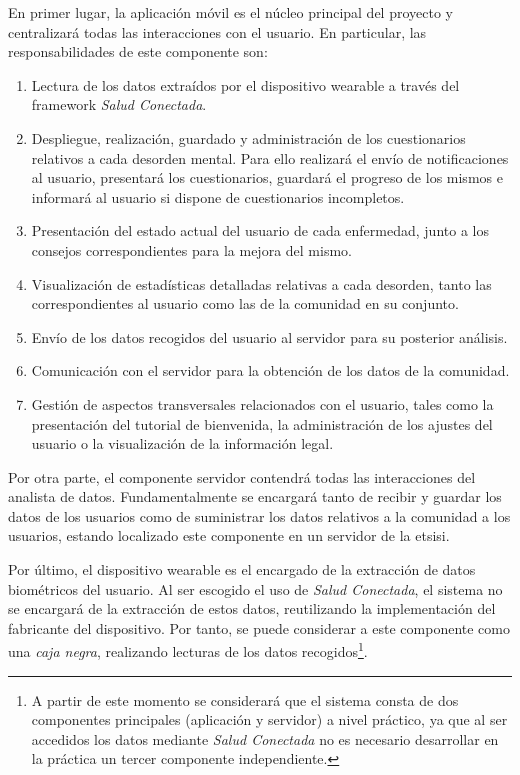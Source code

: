             En primer lugar, la aplicación móvil es el núcleo principal del proyecto y centralizará todas las interacciones con el usuario. En particular, las responsabilidades de este componente son:
            
            \begin{enumerate}
                \item Lectura de los datos extraídos por el dispositivo \gls{wearable} a través del \gls{framework} \textit{Salud Conectada}.
                \item Despliegue, realización, guardado y administración de los cuestionarios relativos a cada desorden mental. Para ello realizará el envío de notificaciones al usuario, presentará los cuestionarios, guardará el progreso de los mismos e informará al usuario si dispone de cuestionarios incompletos.
                \item Presentación del estado actual del usuario de cada enfermedad, junto a los consejos correspondientes para la mejora del mismo.
                \item Visualización de estadísticas detalladas relativas a cada desorden, tanto las correspondientes al usuario como las de la comunidad en su conjunto.
                \item Envío de los datos recogidos del usuario al servidor para su posterior análisis.
                \item Comunicación con el servidor para la obtención de los datos de la comunidad.
                \item Gestión de aspectos transversales relacionados con el usuario, tales como la presentación del tutorial de bienvenida, la administración de los ajustes del usuario  o la visualización de la información legal.
            \end{enumerate}
                
            Por otra parte, el componente servidor contendrá todas las interacciones del analista de datos. Fundamentalmente se encargará tanto de recibir y guardar los datos de los usuarios como de suministrar los datos relativos a la comunidad a los usuarios, estando localizado este componente en un servidor de la \gls{etsisi}.
            
            Por último, el dispositivo \gls{wearable} es el encargado de la extracción de datos biométricos del usuario. Al ser escogido el uso de \textit{Salud Conectada}, el sistema no se encargará de la extracción de estos datos, reutilizando la implementación del fabricante del dispositivo. Por tanto, se puede considerar a este componente como una \textit{caja negra}, realizando lecturas de los datos recogidos\footnote{A partir de este momento se considerará que el sistema consta de dos componentes principales (aplicación y servidor) a nivel práctico, ya que al ser accedidos los datos mediante \textit{Salud Conectada} no es necesario desarrollar en la práctica un tercer componente independiente.}.

